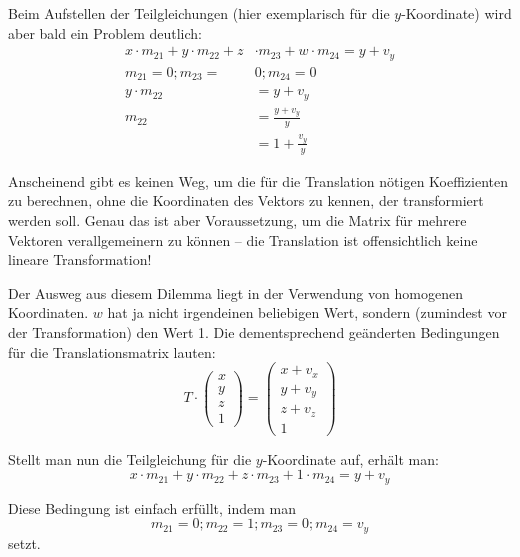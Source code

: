 Beim Aufstellen der Teilgleichungen (hier exemplarisch für die $y$-Koordinate) wird aber bald ein Problem deutlich:
\begin{equation}
\begin{split}
 x \cdot m_{21} + y \cdot m_{22} + z & \cdot m_{23} + w \cdot m_{24} = y + v_y \\
 m_{21} = 0; m_{23} = & 0; m_{24} = 0 \\
 y \cdot m_{22} & = y + v_y \\
 m_{22} & = \frac{y + v_y}{y} \\
 & = 1 + \frac{v_y}{y}
\end{split}
\end{equation}

Anscheinend gibt es keinen Weg, um die für die Translation nötigen Koeffizienten zu berechnen, ohne die Koordinaten des Vektors zu kennen, der transformiert werden soll. Genau das ist aber Voraussetzung, um die Matrix für mehrere Vektoren verallgemeinern zu können -- die Translation ist offensichtlich keine lineare Transformation!

Der Ausweg aus diesem Dilemma liegt in der Verwendung von homogenen Koordinaten. $w$ hat ja nicht irgendeinen beliebigen Wert, sondern (zumindest vor der Transformation) den Wert 1. Die dementsprechend geänderten Bedingungen für die Translationsmatrix lauten:
\begin{equation}
 T \cdot 
 \begin{pmatrix}
  x \\
  y \\
  z \\
  1
 \end{pmatrix}
 =
 \begin{pmatrix}
  x + v_x \\
  y + v_y \\
  z + v_z \\
  1
 \end{pmatrix}
\end{equation}

Stellt man nun die Teilgleichung für die $y$-Koordinate auf, erhält man:
\begin{equation}
 x \cdot m_{21} + y \cdot m_{22} + z \cdot m_{23} + 1 \cdot m_{24} = y + v_y
\end{equation}

Diese Bedingung ist einfach erfüllt, indem man
\begin{equation}
 m_{21} = 0; m_{22} = 1; m_{23} = 0; m_{24} = v_y
\end{equation}
setzt.

